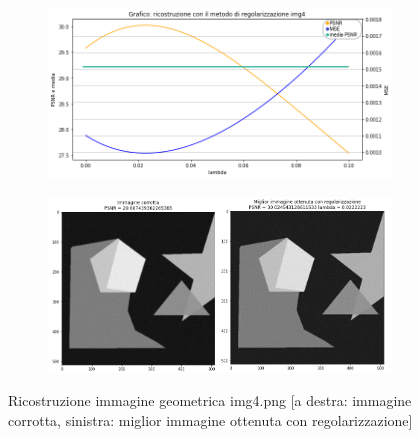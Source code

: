 \begin{figure}[H]
    \centering
    \begin{subfigure}{0.5\textwidth}
        \includegraphics[width=\textwidth]{imgRicostruzione/grafico4minimize.png}
    \end{subfigure}%
    \begin{subfigure}{0.5\textwidth}
        \centering
        \includegraphics[width=\textwidth]{imgRicostruzione/ricostruzione4minimize.png}
    \end{subfigure}
    \caption{Ricostruzione immagine geometrica img4.png [a destra: immagine corrotta, sinistra: miglior immagine ottenuta con regolarizzazione]}


\end{figure}
